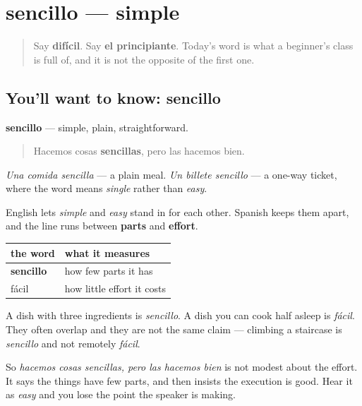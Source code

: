 \section[sencillo]{sencillo — simple}

\label{lesson:ES-C471-sencillo}



\begin{quote}
Say \textbf{difícil}. Say \textbf{el principiante}. Today's word is what a beginner's class is full of, and it is not the opposite of the first one.
\end{quote}

\subsection*{You'll want to know: sencillo}
\textbf{sencillo} — simple, plain, straightforward.

\begin{quote}
Hacemos cosas \textbf{sencillas}, pero las hacemos bien.
\end{quote}

\emph{Una comida sencilla} — a plain meal. \emph{Un billete sencillo} — a one-way ticket, where the word means \emph{single} rather than \emph{easy}.

\begin{grammarlens}[title={Grammar Lens: sencillo is not fácil}]
English lets \emph{simple} and \emph{easy} stand in for each other. Spanish keeps them apart, and the line runs between \textbf{parts} and \textbf{effort}.

\noindent
\begin{tabularx}{\linewidth}{@{}>{\raggedright\arraybackslash}X>{\raggedright\arraybackslash}X@{}}
\toprule
\textbf{the word} & \textbf{what it measures} \\
\midrule
\textbf{sencillo} & how few parts it has \\
fácil & how little effort it costs \\
\bottomrule
\end{tabularx}

A dish with three ingredients is \emph{sencillo}. A dish you can cook half asleep is \emph{fácil}. They often overlap and they are not the same claim — climbing a staircase is \emph{sencillo} and not remotely \emph{fácil}.

So \emph{hacemos cosas sencillas, pero las hacemos bien} is not modest about the effort. It says the things have few parts, and then insists the execution is good. Hear it as \emph{easy} and you lose the point the speaker is making.
\end{grammarlens}

